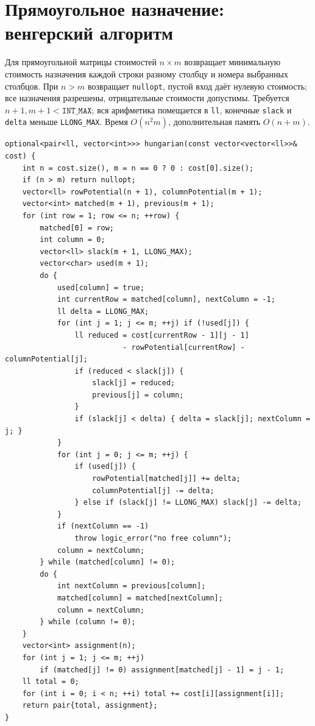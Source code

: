\section{Прямоугольное назначение: венгерский алгоритм}
Для прямоугольной матрицы стоимостей $n\times m$ возвращает минимальную стоимость назначения каждой строки разному столбцу и номера выбранных столбцов.
При $n>m$ возвращает \texttt{nullopt}, пустой вход даёт нулевую стоимость; все назначения разрешены, отрицательные стоимости допустимы.
Требуется $n+1,m+1<\texttt{INT\_MAX}$; вся арифметика помещается в \texttt{ll}, конечные \texttt{slack} и \texttt{delta} меньше \texttt{LLONG\_MAX}.
Время $O(n^2m)$, дополнительная память $O(n+m)$.
\begin{lstlisting}[name=advanced_graph_hungarian]
optional<pair<ll, vector<int>>> hungarian(const vector<vector<ll>>& cost) {
    int n = cost.size(), m = n == 0 ? 0 : cost[0].size();
    if (n > m) return nullopt;
    vector<ll> rowPotential(n + 1), columnPotential(m + 1);
    vector<int> matched(m + 1), previous(m + 1);
    for (int row = 1; row <= n; ++row) {
        matched[0] = row;
        int column = 0;
        vector<ll> slack(m + 1, LLONG_MAX);
        vector<char> used(m + 1);
        do {
            used[column] = true;
            int currentRow = matched[column], nextColumn = -1;
            ll delta = LLONG_MAX;
            for (int j = 1; j <= m; ++j) if (!used[j]) {
                ll reduced = cost[currentRow - 1][j - 1]
                           - rowPotential[currentRow] - columnPotential[j];
                if (reduced < slack[j]) {
                    slack[j] = reduced;
                    previous[j] = column;
                }
                if (slack[j] < delta) { delta = slack[j]; nextColumn = j; }
            }
            for (int j = 0; j <= m; ++j) {
                if (used[j]) {
                    rowPotential[matched[j]] += delta;
                    columnPotential[j] -= delta;
                } else if (slack[j] != LLONG_MAX) slack[j] -= delta;
            }
            if (nextColumn == -1)
                throw logic_error("no free column");
            column = nextColumn;
        } while (matched[column] != 0);
        do {
            int nextColumn = previous[column];
            matched[column] = matched[nextColumn];
            column = nextColumn;
        } while (column != 0);
    }
    vector<int> assignment(n);
    for (int j = 1; j <= m; ++j)
        if (matched[j] != 0) assignment[matched[j] - 1] = j - 1;
    ll total = 0;
    for (int i = 0; i < n; ++i) total += cost[i][assignment[i]];
    return pair{total, assignment};
}
\end{lstlisting}
